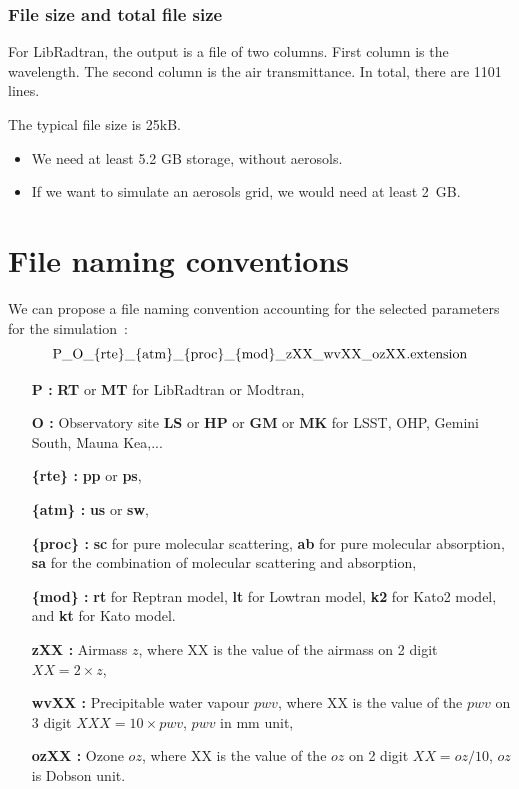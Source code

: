\documentclass[a4paper]{article}
\begin{document}
\subsubsection{File size and total file size}
For LibRadtran, the output is a file of two columns. First column is the wavelength. The second column is the air transmittance.
In total, there are 1101 lines.

The typical file size is 25kB.

\begin{itemize}
\item We need at least 5.2  GB storage, without aerosols. 
\item If we want to simulate an aerosols grid, we would need at least 2~GB.
\end{itemize}

\section{File naming conventions}

We can propose a file naming convention accounting for the selected parameters for the simulation~:
\begin{equation}
{\rm  P\_O\_\{rte\}\_\{atm\}\_\{proc\}\_\{mod\}\_zXX\_wvXX\_ozXX.extension  }\nonumber
\end{equation}

\begin{itemize}
\item [{\bf P :} ] {\bf RT} or {\bf MT} for LibRadtran or Modtran,
\item [{\bf O :} ]  Observatory site {\bf LS} or {\bf HP}  or {\bf GM}  or {\bf MK} for LSST, OHP, Gemini South, Mauna Kea,...
\item [{\bf \{rte\} :}] {\bf pp} or  {\bf ps},
\item [{\bf \{atm\} :}]  {\bf us} or {\bf sw},
\item [{\bf \{proc\} :}] {\bf sc} for pure molecular scattering, {\bf ab} for pure molecular absorption, {\bf sa} for the combination of molecular scattering and absorption,
\item [{\bf \{mod\} :}] {\bf rt} for Reptran model, {\bf lt} for Lowtran model, {\bf k2} for Kato2 model, and {\bf kt} for Kato model.
\item [{\bf zXX :} ] Airmass $z$, where XX is the value of the airmass on 2 digit $XX=2\times z$,
\item [{\bf wvXX :} ] Precipitable water vapour $pwv$, where XX is the value of the $pwv$ on 3 digit $XXX=10\times pwv$, $pwv$ in mm unit,
\item [{\bf ozXX :} ] Ozone $oz$, where XX is the value of the $oz$ on 2 digit $XX=oz/10$, $oz$ is Dobson unit.
\end{itemize}
\end{document}
